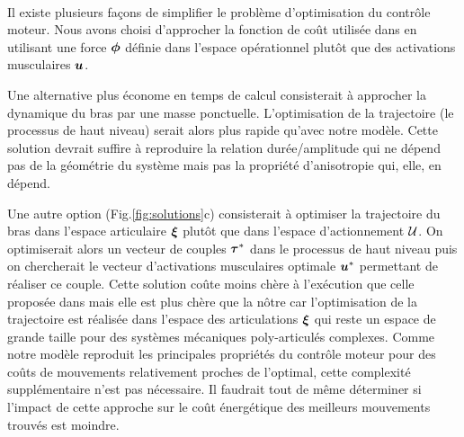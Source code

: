 \documentclass[pdftex,a4paper,11pt]{article}
\begin{document}


\paragraph{}
Il existe plusieurs façons de simplifier le problème d'optimisation du con\-trô\-le
moteur. Nous avons choisi d'approcher la fonction de coût utilisée dans
\cite{rigoux11} en utilisant une force $\boldsymbol{\phi}$ définie dans
l'espace opérationnel plutôt que des activations musculaires $\boldsymbol{u}$.

Une alternative plus économe en temps de calcul consisterait à approcher la dynamique
du bras par une masse ponctuelle.
L'optimisation de la trajectoire (le processus de haut niveau) serait alors
plus rapide qu'avec notre modèle.
Cette solution devrait suffire à reproduire la relation durée/amplitude
qui ne dépend pas de la géométrie du système mais pas la propriété
d'ani\-so\-tro\-pie qui, elle, en dépend.

Une autre option (Fig.\ref{fig:solutions}c) consisterait à optimiser la trajectoire du bras dans l'espace
articulaire $\boldsymbol{\xi}$ plutôt que dans l'espace d'actionnement $\mathcal{U}$.
On optimiserait alors un vecteur de couples $\boldsymbol{\tau}^*$ dans le processus de haut niveau
puis on chercherait le vecteur d'activations musculaires optimale $\boldsymbol{u}^*$
permettant de réaliser ce couple.
Cette solution coûte moins chère à l'exécution que celle proposée dans \cite{rigoux11}
mais elle est plus chère que la nôtre car l'optimisation de la trajectoire
est réalisée dans l'espace des articulations $\boldsymbol{\xi}$ qui reste un espace de
grande taille pour des systèmes mécaniques poly-articulés complexes.
Comme notre modèle reproduit les principales propriétés du contrôle moteur pour
des coûts de mouvements relativement proches de l'optimal, cette complexité
supplémentaire n'est pas nécessaire.
Il faudrait tout de même déterminer si l'impact de cette approche sur le coût
énergétique des meilleurs mouvements trouvés est moindre.

\end{document}
